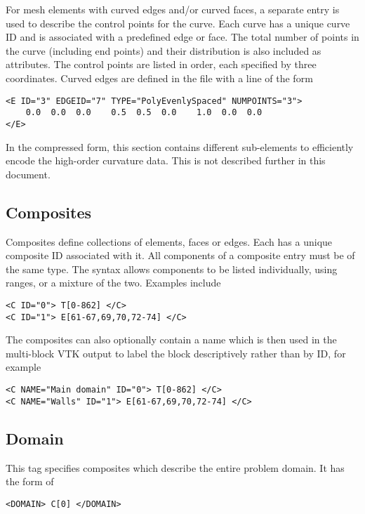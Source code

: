 For mesh elements with curved edges and/or curved faces, a separate entry is used to describe the control points for the curve. Each curve has a unique curve ID and is associated with a predefined edge or face. The total number of points in the curve (including end points) and their distribution is also included as attributes. The control points are listed in order, each specified by three coordinates. Curved edges are defined in the file with a line of the form
\begin{lstlisting}[style=XMLStyle]
<E ID="3" EDGEID="7" TYPE="PolyEvenlySpaced" NUMPOINTS="3">
    0.0  0.0  0.0    0.5  0.5  0.0    1.0  0.0  0.0
</E>
\end{lstlisting}

\begin{notebox}
    In the compressed form, this section contains different sub-elements to
    efficiently encode the high-order curvature data. This is not described
    further in this document.
\end{notebox}

\subsection{Composites}
Composites define collections of elements, faces or edges. Each has a unique composite ID associated with it. All components of a composite entry must be of the same type. The syntax allows components to be listed individually, using ranges, or a mixture of the two. Examples include
\begin{lstlisting}[style=XMLStyle]
<C ID="0"> T[0-862] </C>
<C ID="1"> E[61-67,69,70,72-74] </C>
\end{lstlisting}

The composites can also optionally contain a name which is then used in the
multi-block VTK output to label the block descriptively rather than by ID, for
example
\begin{lstlisting}[style=XMLStyle]
<C NAME="Main domain" ID="0"> T[0-862] </C>
<C NAME="Walls" ID="1"> E[61-67,69,70,72-74] </C>
\end{lstlisting}

\subsection{Domain}
This tag specifies composites which describe the entire problem domain. It has the form of
\begin{lstlisting}[style=XMLStyle]
<DOMAIN> C[0] </DOMAIN>
\end{lstlisting}
